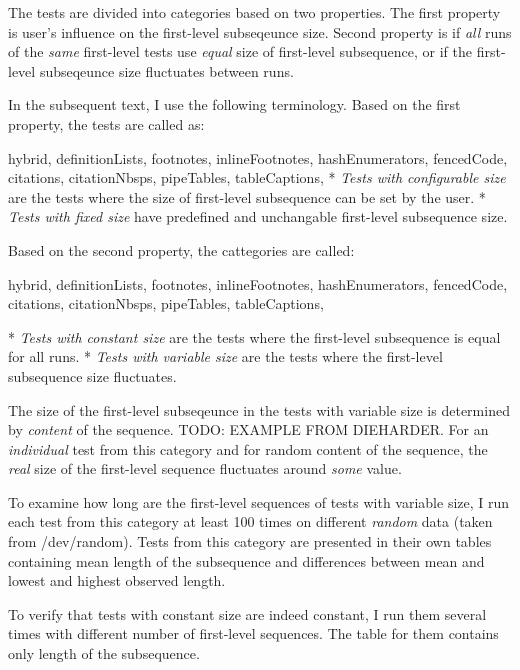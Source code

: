 \documentclass[
  digital,     %
  oneside,     %
  nosansbold,  %
  nocolorbold, %
  nolof,         %
  nolot,         %
]{fithesis4}
\begin{document}
The tests are divided into categories based on two properties. The first property is user's influence on the first-level subseqeunce size. Second property is if \emph{all} runs of the \emph{same} first-level tests use \emph{equal} size of first-level subsequence, or if the first-level subseqeunce size fluctuates between runs. 

In the subsequent text, I use the following terminology. Based on the first property, the tests are called as:
\begin{markdown*}{%
  hybrid,
  definitionLists,
  footnotes,
  inlineFootnotes,
  hashEnumerators,
  fencedCode,
  citations,
  citationNbsps,
  pipeTables,
  tableCaptions,
}
* \emph{Tests with configurable size} are the tests where the size of first-level subsequence can be set by the user.
* \emph{Tests with fixed size} have predefined and unchangable first-level subsequence size.
\end{markdown*}
Based on the second property, the cattegories are called:
\begin{markdown*}{%
  hybrid,
  definitionLists,
  footnotes,
  inlineFootnotes,
  hashEnumerators,
  fencedCode,
  citations,
  citationNbsps,
  pipeTables,
  tableCaptions,
}

* \emph{Tests with constant size} are the tests where the first-level subsequence is equal for all runs.
* \emph{Tests with variable size} are the tests where the first-level subsequence size fluctuates.

\end{markdown*}

The size of the first-level subseqeunce in the tests with variable size is determined by \emph{content} of the sequence. TODO: EXAMPLE FROM DIEHARDER. For an \emph{individual} test from this category and for random content of the sequence, the \emph{real} size of the first-level sequence fluctuates around \emph{some} value. 

To examine how long are the first-level sequences of tests with variable size, I run each test from this category at least 100 times on different \emph{random} data (taken from /dev/random). Tests from this category are presented in their own tables containing mean length of the subsequence and differences between mean and lowest and highest observed length.

To verify that tests with constant size are indeed constant, I run them several times with different number of first-level sequences. The table for them contains only length of the subsequence.
\end{document}
